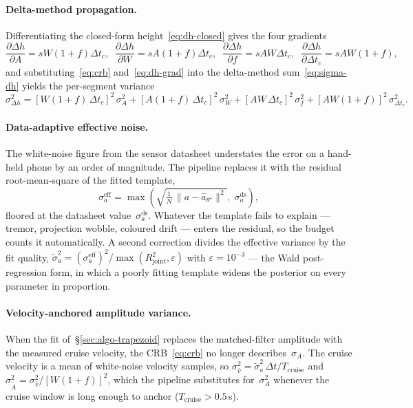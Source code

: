 \documentclass[manuscript,review,screen]{acmart}
\begin{document}
\paragraph{Delta-method propagation.}
Differentiating the closed-form height~\eqref{eq:dh-closed} gives the
four gradients
\begin{equation}
  \frac{\partial\Delta h}{\partial A}=sW(1{+}f)\Delta t_c,\;\;
  \frac{\partial\Delta h}{\partial W}=sA(1{+}f)\Delta t_c,\;\;
  \frac{\partial\Delta h}{\partial f}=sAW\Delta t_c,\;\;
  \frac{\partial\Delta h}{\partial\Delta t_c}=sAW(1{+}f),
  \label{eq:dh-grad}
\end{equation}
and substituting~\eqref{eq:crb} and~\eqref{eq:dh-grad}
into the delta-method sum~\eqref{eq:sigma-dh} yields the per-segment
variance
\[
  \sigma_{\Delta h}^{2}
  =[W(1{+}f)\,\Delta t_c]^{2}\,\sigma_A^{2}
   +[A(1{+}f)\,\Delta t_c]^{2}\,\sigma_W^{2}
   +[AW\,\Delta t_c]^{2}\,\sigma_f^{2}
   +[AW(1{+}f)]^{2}\,\sigma_{\Delta t_c}^{2}.
\]

\paragraph{Data-adaptive effective noise.}
The white-noise figure from the sensor datasheet understates the
error on a hand-held phone by an order of magnitude.  The pipeline
replaces it with the residual root-mean-square of the fitted
template,
\[
  \sigma_a^{\mathrm{eff}}
  =\max\!\left(
    \sqrt{\tfrac1N\,\|a-\hat a_{\theta^{\star}}\|^{2}},\;
    \sigma_a^{\mathrm{ds}}\right),
\]
floored at the datasheet value~$\sigma_a^{\mathrm{ds}}$.  Whatever
the template fails to explain --- tremor, projection wobble, coloured
drift --- enters the residual, so the budget counts it automatically.
A second correction divides the effective variance by the fit
quality, $\tilde\sigma_a^{2}=(\sigma_a^{\mathrm{eff}})^{2}/
\max(R^{2}_{\mathrm{joint}},\varepsilon)$ with
$\varepsilon=10^{-3}$ --- the Wald post-regression form, in which a
poorly fitting template widens the posterior on every parameter in
proportion.

\paragraph{Velocity-anchored amplitude variance.}
When the fit of~\S\ref{sec:algo-trapezoid} replaces the
matched-filter amplitude with the measured cruise velocity, the
CRB~\eqref{eq:crb} no longer describes~$\sigma_A$.  The cruise
velocity is a mean of white-noise velocity samples, so
$\sigma_{\bar v}^{2}=\tilde\sigma_a^{2}\,\Delta t/T_{\mathrm{cruise}}$
and
$\sigma_{\widetilde A}^{2}=\sigma_{\bar v}^{2}/[W(1+f)]^{2}$, which
the pipeline substitutes for~$\sigma_A^{2}$ whenever the cruise
window is long enough to anchor ($T_{\mathrm{cruise}}>0.5$\,s).
\end{document}
